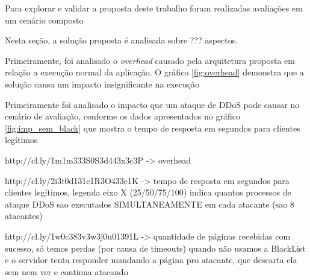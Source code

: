 
Para explorar e validar a proposta deste trabalho foram realizadas avaliações em um cenário composto 

Nesta seção, a solução proposta é analisada sobre ??? aspectos. 

Primeiramente, foi analisado o \emph{overhead} causado pela arquitetura proposta em relação a execução normal da aplicação. O gráfico \ref{fig:overhead} demonstra que a solução causa um impacto insignificante na execução 

Primeiramente foi analisado o impacto que um ataque de DDoS pode causar no cenário de avaliação, conforme os dados apresentados no gráfico \ref{fig:imp_sem_black} que mostra o tempo de resposta em segundos para clientes legítimos


http://cl.ly/1m1m333S0S3d443x3c3P -> overhead



http://cl.ly/2i3t0d131c1R3O433e1K -> tempo de resposta em segundos para clientes legítimos, legenda eixo X (25/50/75/100) indica quantos processos de ataque DDoS sao executados SIMULTANEAMENTE em cada atacante (sao 8 atacantes)



http://cl.ly/1w0c383v3w3j0u01391L -> quantidade de páginas recebidas com sucesso, só temos perdas (por causa de timeouts) quando não usamos a BlackList e o servidor tenta responder mandando a página pro atacante, que descarta ela sem nem ver e continua atacando


